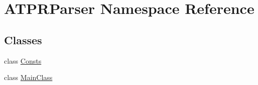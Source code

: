 \hypertarget{namespace_a_t_p_r_parser}{}\section{A\+T\+P\+R\+Parser Namespace Reference}
\label{namespace_a_t_p_r_parser}
\subsection*{Classes}
\begin{DoxyCompactItemize}
\item 
class \hyperlink{class_a_t_p_r_parser_1_1_consts}{Consts}
\item 
class \hyperlink{class_a_t_p_r_parser_1_1_main_class}{Main\+Class}
\end{DoxyCompactItemize}
